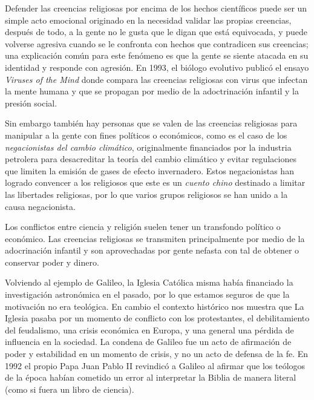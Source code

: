 Defender las creencias religiosas por encima de los hechos científicos puede ser
un simple acto emocional originado en la necesidad validar las propias
creencias, después de todo, a la gente no le gusta que le digan que está
equivocada, y puede volverse agresiva cuando se le confronta con hechos que
contradicen sus creencias; una explicación común para este fenómeno es que la
gente se siente atacada en su identidad y responde con agresión.
En 1993, el biólogo evolutivo  publicó
el ensayo \emph{Viruses of the Mind}\cite{Dahlbom1993-ky} donde compara las
creencias religiosas con virus que infectan la mente humana y que se propagan
por medio de la adoctrinación infantil y la presión social.

Sin embargo también hay personas que se valen de las creencias religiosas para
manipular a la gente con fines políticos o económicos, como es el caso de los
\emph{negacionistas del cambio climático}, originalmente financiados por la
industria petrolera para desacreditar la teoría del cambio climático y evitar
regulaciones que limiten la emisión de gases de efecto invernadero.
Estos negacionistas han logrado convencer a los religiosos que este es un
\emph{cuento chino} destinado a limitar las libertades religiosas, por lo que
varios grupos religiosos se han unido a la causa negacionista.

\begin{remember}
    \label{rem:religion}
    Los conflictos entre ciencia y religión suelen tener un transfondo político
    o económico.
    Las creencias religiosas se transmiten principalmente por medio de la
    adocrinación infantil y son aprovechadas por gente nefasta con tal de
    obtener o conservar poder y dinero.
\end{remember}

Volviendo al ejemplo de Galileo, la Iglesia Católica misma había financiado la
investigación astronómica en el pasado, por lo que estamos seguros de que la
motivación no era teológica.
En cambio el contexto histórico nos muestra que La Iglesia pasaba por un momento
de conflicto con los protestantes, el debilitamiento del feudalismo, una crisis
económica en Europa, y una general una pérdida de influencia en la sociedad.
La condena de Galileo fue un acto de afirmación de poder y estabilidad en un
momento de crisis, y no un acto de defensa de la fe.
En 1992 el propio Papa Juan Pablo II revindicó a Galileo al afirmar que los
teólogos de la época habían cometido un error al interpretar la Biblia de manera
literal (como si fuera un libro de ciencia).

